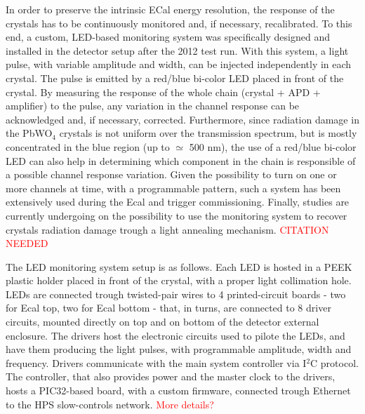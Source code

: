 In order to preserve the intrinsic ECal energy resolution, the response of the crystals has to  be continuously monitored and, if necessary, recalibrated. To this end, a custom, LED-based monitoring system was specifically designed and installed in the detector setup after the 2012 test run. With this system, a light pulse, with variable amplitude and width, can be injected independently in each crystal. The pulse is emitted by a red/blue bi-color LED placed in front of the crystal.
By measuring the response of the whole chain (crystal + APD + amplifier) to the pulse, any variation in the channel response can be acknowledged and, if necessary, corrected. Furthermore, since radiation damage in the PbWO$_4$ crystals is not uniform over the transmission spectrum, but is mostly concentrated in the blue region (up to $\simeq$ 500 nm), the use of a red/blue bi-color LED can also help in determining which component in the chain is responsible of a possible channel response variation. Given the possibility to turn on one or more channels at time, with a programmable pattern, such a system has been extensively used during the Ecal and trigger commissioning. Finally, studies are currently undergoing on the possibility to use the monitoring system to recover crystals radiation damage trough a light annealing mechanism. \textcolor{red}{CITATION NEEDED}

The LED monitoring system setup is as follows. Each LED is hosted in a PEEK plastic holder placed in front of the crystal, with a proper light collimation hole. LEDs are connected trough twisted-pair wires to 4 printed-circuit boards - two for Ecal top, two for Ecal bottom - that, in turns, are connected to 8 driver circuits, mounted directly on top and on bottom of the detector external enclosure. The drivers host the electronic circuits used to pilote the LEDs, and have them producing the light pulses, with programmable amplitude, width and frequency. Drivers communicate with the main system controller via I$^2$C protocol. The controller, that also provides power and the master clock to the drivers, hosts a PIC32-based board, with a custom firmware, connected trough Ethernet to the HPS slow-controls network.
 \textcolor{red}{More details?} 


